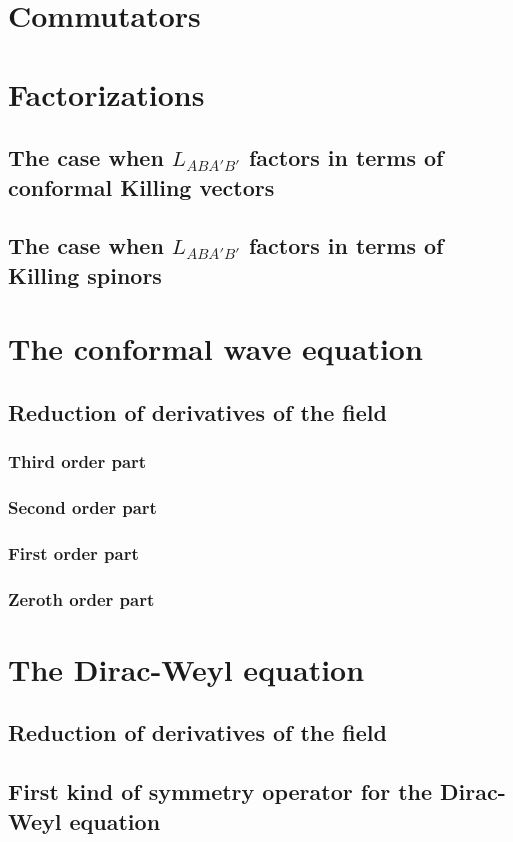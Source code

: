 \documentclass[a4paper, 10pt]{iopart}
\numberwithin{equation}{section}
\begin{document}
\section{Commutators}
\section{Factorizations}
\subsection{The case when $L_{ABA'B'}$ factors in terms of conformal Killing vectors}
\subsection{The case when $L_{ABA'B'}$ factors in terms of Killing spinors}
\section{The conformal wave equation}
\subsection{Reduction of derivatives of the field}
\subsubsection{Third order part}
\subsubsection{Second order part}
\subsubsection{First order part}
\subsubsection{Zeroth order part}
\section{The Dirac-Weyl equation}
\subsection{Reduction of derivatives of the field}
\subsection{First kind of symmetry operator for the Dirac-Weyl equation}
\end{document}
